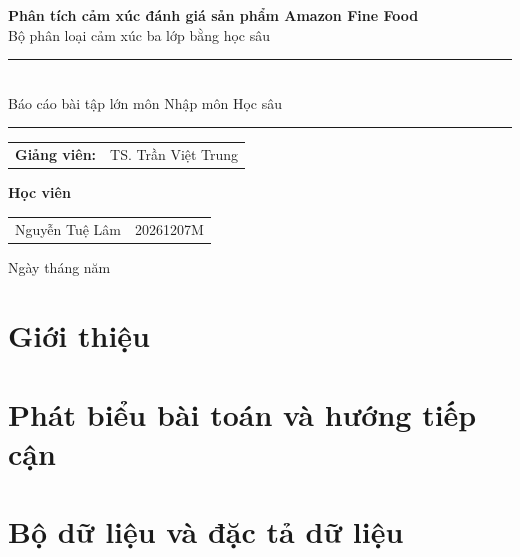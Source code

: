 \documentclass[a4paper,11pt]{report}
\begin{document}
\begin{titlepage}
    \centering
    \vspace*{3cm}

    {\LARGE\bfseries Phân tích cảm xúc đánh giá sản phẩm Amazon Fine Food}\\[0.4cm]
    {\Large Bộ phân loại cảm xúc ba lớp bằng học sâu}\\[2cm]

    \rule{0.8\linewidth}{0.6pt}\\[0.5cm]
    {\large Báo cáo bài tập lớn môn Nhập môn Học sâu}\\[0.2cm]
    \rule{0.8\linewidth}{0.6pt}

    \vfill

    \begin{tabular}{ll}
        \textbf{Giảng viên:} & TS. Trần Việt Trung \\
    \end{tabular}

    \vspace{0.8cm}

    \textbf{Học viên}\\[0.3cm]
    \begin{tabular}{ll}
        Nguyễn Tuệ Lâm & 20261207M \\
    \end{tabular}

    \vspace{1cm}
    {\large Ngày \the\day{} tháng \the\month{} năm \the\year}

    \vspace*{1cm}
\end{titlepage}

\tableofcontents

\chapter{Giới thiệu}
\label{ch:introduction}


\chapter{Phát biểu bài toán và hướng tiếp cận}
\label{ch:problem-approach}


\chapter{Bộ dữ liệu và đặc tả dữ liệu}
\label{ch:dataset}

\end{document}
